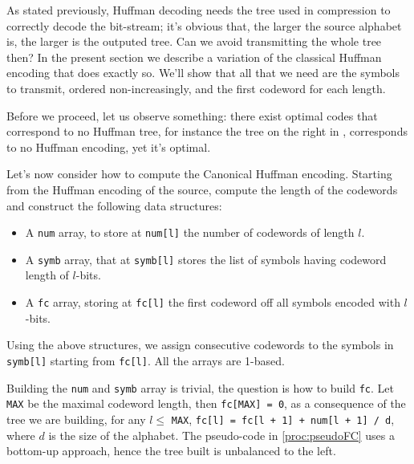 \documentclass{subfiles}
\begin{document}
    As stated previously, Huffman decoding needs the tree used in compression 
        to correctly decode the bit-stream; it's obvious that, the larger the 
        source alphabet is, the larger is the outputed tree.
        Can we avoid transmitting the whole tree then?
        In the present section we describe a variation of the classical Huffman 
        encoding that does exactly so. We'll show that all that we need are 
        the symbols to transmit, ordered non-increasingly, and the first 
        codeword for each length.

    Before we proceed, let us observe something: there exist optimal codes 
        that correspond to no Huffman tree, for instance the tree 
        on the right in , corresponds to no Huffman encoding,
        yet it's optimal.
        
    Let's now consider how to compute the Canonical Huffman encoding.
        Starting from the Huffman encoding of the source,
        compute the length of the codewords and construct the following data structures:
        \begin{itemize}
            \item A \lstinline{num} array, to store at \lstinline{num[l]} the number 
                of codewords of length \(l\).
            \item A \lstinline{symb} array, that at \lstinline{symb[l]} stores 
                the list of symbols having codeword length of \(l\)-bits.
            \item A \lstinline{fc} array, storing at \lstinline{fc[l]}
                the first codeword off all symbols encoded with \(l\)-bits.
        \end{itemize}

        
        
        Using the above structures, we assign consecutive codewords to the symbols 
            in \lstinline{symb[l]} starting from \lstinline{fc[l]}. 
            All the arrays are 1-based.

    Building the \lstinline{num} and \lstinline{symb} array is trivial,
        the question is how to build \lstinline{fc}. Let \lstinline{MAX}
        be the maximal codeword length, then \lstinline{fc[MAX] = 0},
        as a consequence of the tree we are building, for any \(l \le\) \lstinline{MAX},
        \lstinline{fc[l] = fc[l + 1] + num[l + 1] / d}, where \(d\) is the size of the alphabet.
        The pseudo-code in \autoref{proc:pseudoFC} uses a bottom-up approach, hence the tree built is 
        unbalanced to the left.
        
\end{document}
